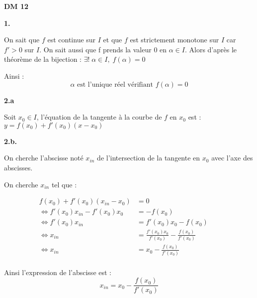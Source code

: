\documentclass[11pt]{article}
\newcommand{\bfrac}[2]{\displaystyle\frac{#1}{#2}}
\begin{document}
\enskip

\vspace{-10px}
\begin{center}
\fontsize{20pt}{20pt}\selectfont
\textbf{DM 12}
\end{center}
\fontsize{11pt}{11pt}\selectfont

\vspace{15px}

\setlength{\abovedisplayskip}{0pt}
\setlength{\belowdisplayskip}{0pt}
\setlength{\abovedisplayshortskip}{0pt}
\setlength{\belowdisplayshortskip}{0pt}

\textbf{1.}

\noindent On sait que $f$ est continue sur $I$ et que $f$ est strictement monotone sur $I$ car $f' > 0$ sur $I$. On sait aussi que f prends la valeur 0 en $\alpha \in I$. Alors d'après le théorème de la bijection : $\exists!\; \alpha \in I,\; f(\alpha) = 0$

\vspace{15px}
\noindent Ainsi :
\vspace{-15px}
\[\boxed{\alpha \text{ est l'unique réel vérifiant } f(\alpha) = 0}\]
\vspace{10px}

\textbf{2.a}

\noindent Soit $x_0 \in I$, l'équation de la tangente à la courbe de $f$ en  $x_0$ est : $\boxed{y = f(x_0) + f'(x_0)(x-x_0)}$

\vspace{10px}

\textbf{2.b.}

\noindent On cherche l'abscisse noté $x_{in}$ de l'intersection de la tangente en $x_0$ avec l'axe des abscisses.

\noindent On cherche $x_{in}$ tel que :
\vspace{5px}

\begin{align*}
f(x_0) + f'(x_0)(x_{in} - x_0) &= 0 &&\\
\Leftrightarrow f'(x_0)x_{in} - f'(x_0)x_0 &= -f(x_0) &&\\
\Leftrightarrow f'(x_0)x_{in} &= f'(x_0)x_0  - f(x_0) &&\\
\Leftrightarrow x_{in} &= \bfrac{f'(x_0)x_0}{f'(x_0)} - \bfrac{f(x_0)}{f'(x_0)} &&\\
\Leftrightarrow x_{in} &= x_0 - \bfrac{f(x_0)}{f'(x_0)} &&\\
\end{align*}

\vspace{5px}
\noindent Ainsi l'expression de l'abscisse est :
\vspace{-22px}
\[\boxed{x_{in} = x_0 - \bfrac{f(x_0)}{f'(x_0)}}\]
\end{document}
